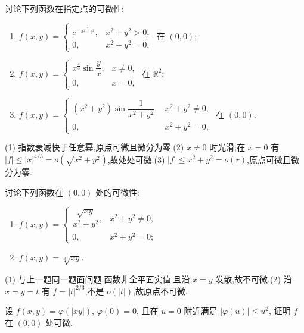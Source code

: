 \begin{example}
    讨论下列函数在指定点的可微性:
    \begin{enumerate}
        \item $\displaystyle f(x,y)=\begin{cases}e^{-\frac{1}{x^2+y^2}},&x^2+y^2>0,\\0,&x^2+y^2=0,\end{cases}$ 在 $(0,0)$;
        \item $\displaystyle f(x,y)=\begin{cases}x^{\frac{4}{3}}\sin\dfrac{y}{x},&x\ne0,\\0,&x=0,\end{cases}$ 在 $\mathbb{R}^2$;
        \item $\displaystyle f(x,y)=\begin{cases}(x^2+y^2)\sin\dfrac{1}{x^2+y^2},&x^2+y^2\ne0,\\0,&x^2+y^2=0,\end{cases}$ 在 $(0,0)$.
    \end{enumerate}
\end{example}
\exampleblank

\begin{solution}
    (1) 指数衰减快于任意幂,原点可微且微分为零.(2) $x\ne0$ 时光滑;在 $x=0$ 有 $|f|\leq|x|^{4/3}=o(\sqrt{x^2+y^2})$,故处处可微.(3) $|f|\leq x^2+y^2=o(r)$,原点可微且微分为零.
\end{solution}

\begin{example}
    讨论下列函数在 $(0,0)$ 处的可微性:
    \begin{enumerate}
        \item $\displaystyle f(x,y)=\begin{cases}\dfrac{\sqrt{xy}}{x^2+y^2},&x^2+y^2\ne0,\\0,&x^2+y^2=0;\end{cases}$
        \item $f(x,y)=\sqrt[3]{xy}$.
    \end{enumerate}
\end{example}
\exampleblank

\begin{solution}
    (1) 与上一题同一题面问题:函数非全平面实值,且沿 $x=y$ 发散,故不可微.(2) 沿 $x=y=t$ 有 $f=|t|^{2/3}$,不是 $o(|t|)$,故原点不可微.
\end{solution}

\begin{example}
    设 $f(x,y)=\varphi(|xy|)$, $\varphi(0)=0$, 且在 $u=0$ 附近满足 $|\varphi(u)|\leq u^2$, 证明 $f$ 在 $(0,0)$ 处可微.
\end{example}
\exampleblank

